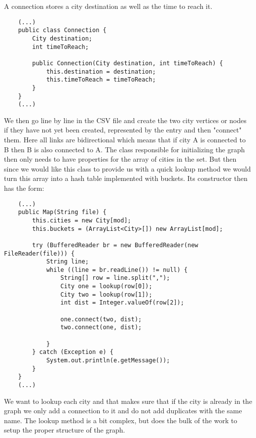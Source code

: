 \documentclass[a4paper,11pt]{article}
\begin{document}
A connection stores a city destination as well as the time to reach it. 
\begin{verbatim}
    (...)
    public class Connection {
        City destination;
        int timeToReach;

        public Connection(City destination, int timeToReach) {
            this.destination = destination;
            this.timeToReach = timeToReach;
        }
    }
    (...)
\end{verbatim}

We then go line by line in the CSV file and create the two city vertices or nodes if they have not yet been created, represented by the entry and then "connect" them. Here all links are bidirectional which means that if city A is connected to B then B is also connected to A. The class responsible for initializing the graph then only needs to have properties for the array of cities in the set. But then since we would like this class to provide us with a quick lookup method we would turn this array into a hash table implemented with buckets. Its constructor then has the form:

\begin{verbatim}
    (...)
    public Map(String file) {
        this.cities = new City[mod];
        this.buckets = (ArrayList<City>[]) new ArrayList[mod];

        try (BufferedReader br = new BufferedReader(new FileReader(file))) {
            String line;
            while ((line = br.readLine()) != null) {
                String[] row = line.split(",");
                City one = lookup(row[0]);
                City two = lookup(row[1]);
                int dist = Integer.valueOf(row[2]);

                one.connect(two, dist);
                two.connect(one, dist);

            }
        } catch (Exception e) {
            System.out.println(e.getMessage());
        }
    }
    (...)
\end{verbatim}
We want to lookup each city and that makes sure that if the city is already in the graph we only add a connection to it and do not add duplicates with the same name. The lookup method is a bit complex, but does the bulk of the work to setup the proper structure of the graph.
\end{document}
